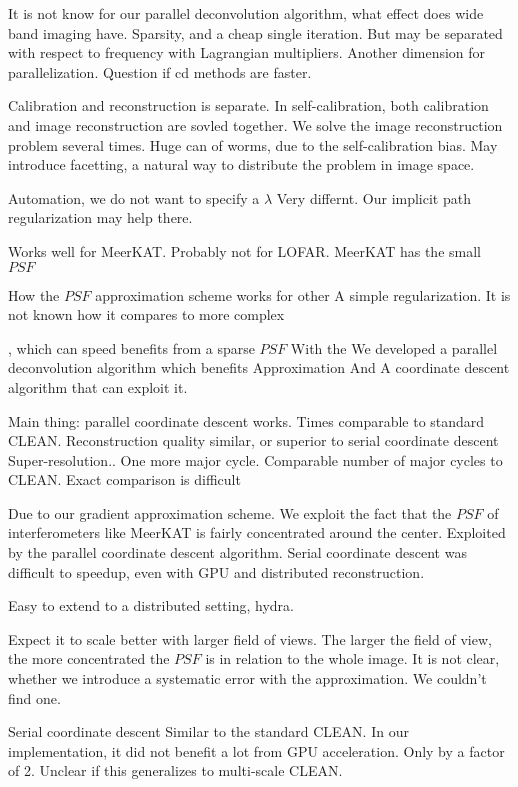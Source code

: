It is not know for our parallel deconvolution algorithm, what effect does wide band imaging have. 
Sparsity, and a cheap single iteration.
But may be separated with respect to frequency with Lagrangian multipliers. Another dimension for parallelization. 
Question if cd methods are faster.

Calibration and reconstruction is separate. In self-calibration, both calibration and image reconstruction are sovled together. We solve the image reconstruction problem several times.
Huge can of worms, due to the self-calibration bias.
May introduce facetting, a natural way to distribute the problem in image space.

Automation, we do not want to specify a $\lambda$
Very differnt.
Our implicit path regularization may help there.


Works well for MeerKAT. Probably not for LOFAR. MeerKAT has the small $PSF$










How the $PSF$ approximation scheme works for other 
A simple regularization. It is not known how it compares to more complex 


 , which can speed benefits from a sparse $PSF$ With the  We developed a parallel deconvolution algorithm which benefits
Approximation
And A coordinate descent algorithm that can  exploit it.

Main thing: parallel coordinate descent works.
Times comparable to standard CLEAN.
Reconstruction quality similar, or superior to serial coordinate descent
Super-resolution..
One more major cycle.
Comparable number of major cycles to CLEAN. Exact comparison is difficult

Due to our gradient approximation scheme. We exploit the fact that the $PSF$ of interferometers like MeerKAT is fairly concentrated around the center.
Exploited by the parallel coordinate descent algorithm. 
Serial coordinate descent was difficult to speedup, even with GPU and distributed reconstruction.

Easy to extend to a distributed setting, hydra.

Expect it to scale better with larger field of views. The larger the field of view, the more concentrated the $PSF$ is in relation to the whole image.
It is not clear, whether we introduce a systematic error with the approximation. We couldn't find one.

Serial coordinate descent
Similar to the standard CLEAN.
In our implementation, it did not benefit a lot from GPU acceleration. Only by a factor of 2. Unclear if this generalizes to multi-scale CLEAN.

